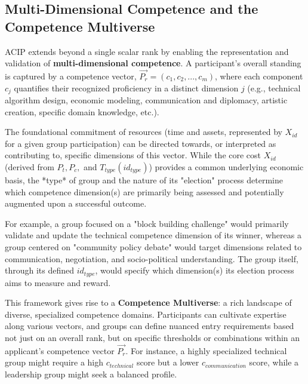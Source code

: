 \documentclass{article}
\begin{document}
\begin{CJK}{UTF8}{gbsn}
        \subsection{Multi-Dimensional Competence and the Competence Multiverse}
        \label{sec:multi_dimensional_competence}

        ACIP extends beyond a single scalar rank by enabling the representation and validation of \textbf{multi-dimensional competence}. A participant's overall standing is captured by a competence vector, $\vec{P_r} = (c_1, c_2, ..., c_m)$, where each component $c_j$ quantifies their recognized proficiency in a distinct dimension $j$ (e.g., technical algorithm design, economic modeling, communication and diplomacy, artistic creation, specific domain knowledge, etc.).

        The foundational commitment of resources (time and assets, represented by $X_{id}$ for a given group participation) can be directed towards, or interpreted as contributing to, specific dimensions of this vector. While the core cost $X_{id}$ (derived from $P_t, P_c,$ and $T_{type}(id_{type})$) provides a common underlying economic basis, the *type* of group and the nature of its "election" process determine which competence dimension(s) are primarily being assessed and potentially augmented upon a successful outcome.

        For example, a group focused on a "block building challenge" would primarily validate and update the technical competence dimension of its winner, whereas a group centered on "community policy debate" would target dimensions related to communication, negotiation, and socio-political understanding. The group itself, through its defined $id_{type}$, would specify which dimension(s) its election process aims to measure and reward.

        This framework gives rise to a \textbf{Competence Multiverse}: a rich landscape of diverse, specialized competence domains. Participants can cultivate expertise along various vectors, and groups can define nuanced entry requirements based not just on an overall rank, but on specific thresholds or combinations within an applicant's competence vector $\vec{P_r}$. For instance, a highly specialized technical group might require a high $c_{technical}$ score but a lower $c_{communication}$ score, while a leadership group might seek a balanced profile.


\end{CJK}
\end{document}

